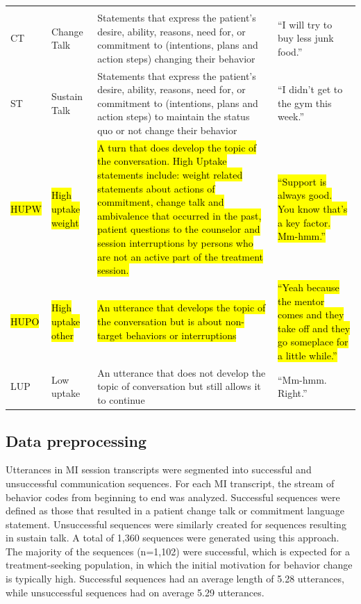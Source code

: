 \documentclass[smallextended]{svjour3}       %
\begin{document}
\begin{small}
\begin{longtable}{p{1.3cm}p{2cm}p{5cm}p{4.8cm}}
\rowcolor{lightgraycol}
\noalign{\smallskip}
\multicolumn{4}{l}{\textbf{Patient}} \\
\noalign{\smallskip}
CT & Change Talk & Statements that express the patient's desire, ability, reasons, need for, or commitment to (intentions, plans and action steps) changing their behavior & ``I will try to buy less junk food.''\\
ST & Sustain Talk & Statements that express the patient's desire, ability, reasons, need for, or commitment to (intentions, plans and action steps) to maintain the status quo or not change their behavior  & ``I didn't get to the gym this week.''\\
\hl{HUPW} & \hl{High uptake weight} & \hl{A turn that does develop the topic of the conversation. High Uptake statements include: weight related statements about actions of commitment, change talk and ambivalence that occurred in the past, patient questions to the counselor and session interruptions by persons who are not an active part of the treatment session.} & \hl{``Support is always good.  You know that's a key factor.  Mm-hmm.''}\\
\hl{HUPO} & \hl{High uptake other} & \hl{An utterance that develops the topic of the conversation but is about non-target behaviors or interruptions} & \hl{``Yeah because the mentor comes and they take off and they go someplace for a little while.''}\\
LUP & Low uptake  & An utterance that does not develop the topic of conversation but still allows it to continue & ``Mm-hmm.  Right.''\\
\hline
\end{longtable}
\end{small}

\subsection{Data preprocessing}
\label{subsec:datapreprocessing}
Utterances in MI session transcripts were segmented into successful and unsuccessful communication sequences. For each MI transcript, the stream of behavior codes from beginning to end was analyzed. Successful sequences were defined as those that resulted in a patient change talk or commitment language statement. Unsuccessful sequences were similarly created for sequences resulting in sustain talk. A total of 1,360 sequences were generated using this approach. The majority of the sequences (n=1,102) were successful, which is expected for a treatment-seeking population, in which the initial motivation for behavior change is typically high. Successful sequences had an average length of 5.28 utterances, while unsuccessful sequences had on average 5.29 utterances.  
\end{document}
